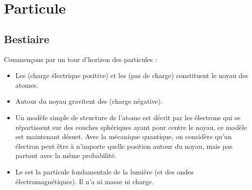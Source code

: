 \documentclass[11pt,class=report,crop=false]{standalone}
\begin{document}








\section{Particule}

\subsection{Bestiaire}

Commençons par un tour d'horizon des particules :
\begin{itemize}
  \item Les  (charge électrique positive) et les  (pas de charge) constituent le noyau des atomes.

  \item Autour du noyau gravitent des  (charge négative). 

  \item Un modèle simple de structure de l'atome est décrit par les électrons qui se répartissent sur des couches sphériques ayant pour centre le noyau, ce modèle est maintenant désuet. Avec la mécanique quantique, on considère qu'un électron peut être à n'importe quelle position  autour du noyau, mais pas partout avec la même probabilité.


  \item Le  est la particule fondamentale de la lumière (et des ondes électromagnétiques). Il n'a ni masse ni charge.
\end{itemize}
\end{document}
